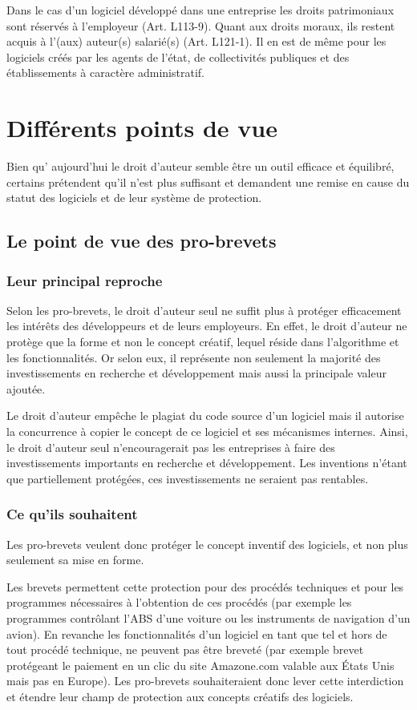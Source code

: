 \documentclass[pdftex,a4paper,11pt]{report}
\begin{document}
Dans le cas d'un logiciel développé dans une entreprise les droits patrimoniaux sont réservés à l'employeur (Art. L113-9). Quant aux droits moraux, ils restent acquis à l'(aux) auteur(s) salarié(s) (Art. L121-1). Il en est de même pour les logiciels créés par les agents de l'état, de collectivités publiques et des établissements à caractère administratif.

\chapter{Différents points de vue}
Bien qu' aujourd'hui le droit d'auteur semble être un outil efficace et équilibré, certains prétendent qu'il n'est plus suffisant et demandent une remise en cause du statut des logiciels et de leur système de protection.

\section{Le point de vue des pro-brevets}

\subsection{Leur principal reproche}
Selon les pro-brevets, le droit d'auteur seul ne suffit plus à protéger efficacement les intérêts des développeurs et de leurs employeurs. En effet, le droit d'auteur ne protège que la forme et non le concept créatif, lequel réside dans l’algorithme et les fonctionnalités. Or selon eux, il représente non seulement la majorité des investissements en recherche et développement mais aussi la principale valeur ajoutée. 

Le droit d'auteur empêche le plagiat du code source d'un logiciel mais il autorise la concurrence à copier le concept de ce logiciel et ses mécanismes internes. Ainsi, le droit d'auteur seul n'encouragerait pas les entreprises à faire des investissements importants en recherche et développement. Les inventions n'étant que partiellement protégées, ces investissements ne seraient pas rentables.

\subsection{Ce qu'ils souhaitent}
Les pro-brevets veulent donc protéger le concept inventif des logiciels, et non plus seulement sa mise en forme.

Les brevets permettent cette protection pour des procédés techniques et pour les programmes nécessaires à l'obtention de ces procédés (par exemple les programmes contrôlant l'ABS d'une voiture ou les instruments de navigation d'un avion). En revanche les fonctionnalités d'un logiciel en tant que tel et hors de tout procédé technique, ne peuvent pas être breveté (par exemple brevet protégeant le paiement en un clic du site Amazone.com valable aux États Unis mais pas en Europe). Les pro-brevets souhaiteraient donc lever cette interdiction et étendre leur champ de protection aux concepts créatifs des logiciels.
\end{document}
